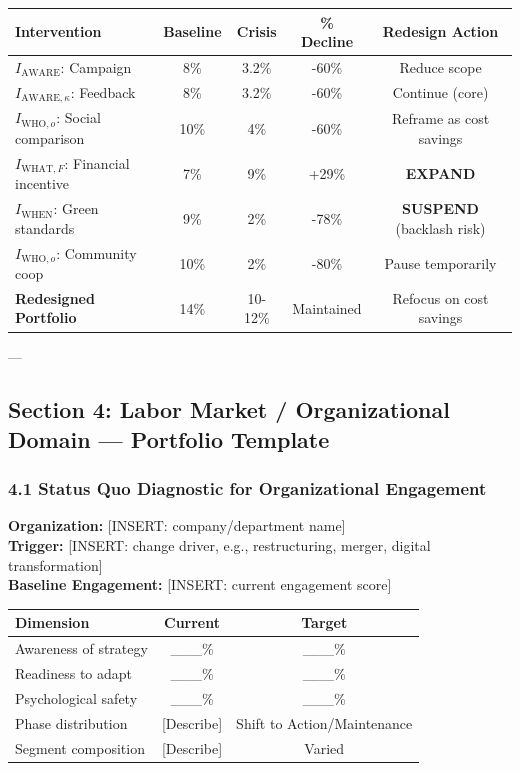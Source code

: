 \begin{center}
\begin{tabular}{@{}lcccc@{}}
\toprule
\textbf{Intervention} & \textbf{Baseline} & \textbf{Crisis} & \textbf{\% Decline} & \textbf{Redesign Action} \\
\midrule
$I_{\text{AWARE}}$: Campaign & 8\% & 3.2\% & -60\% & Reduce scope \\
$I_{\text{AWARE},\kappa}$: Feedback & 8\% & 3.2\% & -60\% & Continue (core) \\
$I_{\text{WHO},o}$: Social comparison & 10\% & 4\% & -60\% & Reframe as cost savings \\
$I_{\text{WHAT},F}$: Financial incentive & 7\% & 9\% & +29\% & \textbf{EXPAND} \\
$I_{\text{WHEN}}$: Green standards & 9\% & 2\% & -78\% & \textbf{SUSPEND} (backlash risk) \\
$I_{\text{WHO},o}$: Community coop & 10\% & 2\% & -80\% & Pause temporarily \\
\midrule
\textbf{Redesigned Portfolio} & 14\% & 10-12\% & Maintained & Refocus on cost savings \\
\midrule
\end{tabular}
\end{center}

---


\subsection*{Section 4: Labor Market / Organizational Domain — Portfolio Template}

\subsubsection*{4.1 Status Quo Diagnostic for Organizational Engagement}

\textbf{Organization:} [INSERT: company/department name] \\
\textbf{Trigger:} [INSERT: change driver, e.g., restructuring, merger, digital transformation] \\
\textbf{Baseline Engagement:} [INSERT: current engagement score]

\begin{center}
\begin{tabular}{@{}lcc@{}}
\toprule
\textbf{Dimension} & \textbf{Current} & \textbf{Target} \\
\midrule
Awareness of strategy & \_\_\_\% & \_\_\_\% \\
Readiness to adapt & \_\_\_\% & \_\_\_\% \\
Psychological safety & \_\_\_\% & \_\_\_\% \\
Phase distribution & [Describe] & Shift to Action/Maintenance \\
Segment composition & [Describe] & Varied \\
\midrule
\end{tabular}
\end{center}

